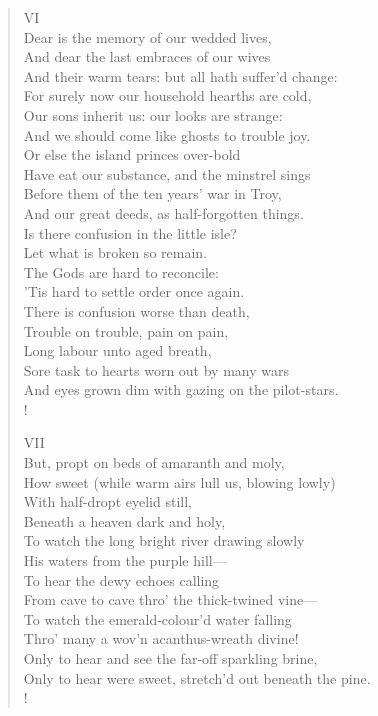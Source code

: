 \documentclass[10pt]{memoir}
\begin{document}
\begin{verse}
VI\\
Dear is the memory of our wedded lives,\\
And dear the last embraces of our wives\\
And their warm tears: but all hath suffer'd change:\\
For surely now our household hearths are cold,\\
Our sons inherit us: our looks are strange:\\
And we should come like ghosts to trouble joy.\\
Or else the island princes over-bold\\
Have eat our substance, and the minstrel sings\\
Before them of the ten years' war in Troy,\\
And our great deeds, as half-forgotten things.\\
Is there confusion in the little isle?\\
Let what is broken so remain.\\
The Gods are hard to reconcile:\\
'Tis hard to settle order once again.\\
There is confusion worse than death,\\
Trouble on trouble, pain on pain,\\
Long labour unto aged breath,\\
Sore task to hearts worn out by many wars\\
And eyes grown dim with gazing on the pilot-stars.\\!

VII\\
But, propt on beds of amaranth and moly,\\
How sweet (while warm airs lull us, blowing lowly)\\
With half-dropt eyelid still,\\
Beneath a heaven dark and holy,\\
To watch the long bright river drawing slowly\\
His waters from the purple hill---\\
To hear the dewy echoes calling\\
From cave to cave thro' the thick-twined vine---\\
To watch the emerald-colour'd water falling\\
Thro' many a wov'n acanthus-wreath divine!\\
Only to hear and see the far-off sparkling brine,\\
Only to hear were sweet, stretch'd out beneath the pine.\\!


\end{verse}
\end{document}
